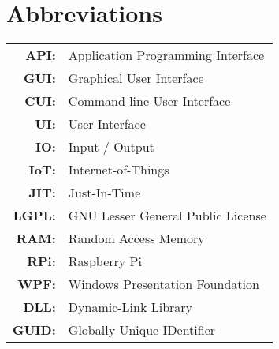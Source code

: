 \renewcommand{\baselinestretch}{1}
\chapter{Abbreviations}

\begin{tabular}{rl}
  \vspace{0.1em} \textbf{API:} & Application Programming Interface \\
  \vspace{0.1em} \textbf{GUI:} & Graphical User Interface \\
  \vspace{0.1em} \textbf{CUI:} & Command-line User Interface \\
  \vspace{0.1em} \textbf{UI:} & User Interface \\
  \vspace{0.1em} \textbf{IO:} & Input / Output \\
  \vspace{0.1em} \textbf{IoT:} & Internet-of-Things \\
  \vspace{0.1em} \textbf{JIT:} & Just-In-Time \\
  \vspace{0.1em} \textbf{LGPL:} & GNU Lesser General Public License \\
  \vspace{0.1em} \textbf{RAM:} & Random Access Memory \\
  \vspace{0.1em} \textbf{RPi:} & Raspberry Pi \\
  \vspace{0.1em} \textbf{WPF:} & Windows Presentation Foundation \\
  \vspace{0.1em} \textbf{DLL:} & Dynamic-Link Library \\
  \vspace{0.1em} \textbf{GUID:} & Globally Unique IDentifier \\
\end{tabular}


